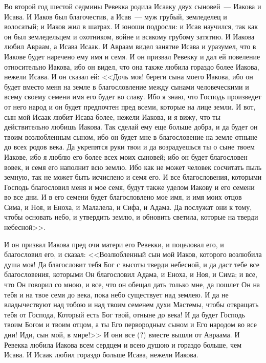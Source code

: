 Во второй год шестой седмины Ревекка родила
Исааку двух сыновей~--- Иакова и Исава. И Иаков был
благочестив, а Исав~--- муж грубый, земледелец и
волосатый; и Иаков жил в шатрах. И юноши подросли:
и Исав научился, так как он был земледельцем и
охотником, войне и всякому грубому затятию. И
Иакова любил Авраам, а Исава Исаак. И Авраам видел
занятие Исава и уразумел, что в Иакове будет
наречено ему имя и семя. И он призвал Ревекку и
дал ей повеление относительно Иакова, ибо он
видел, что она также любила гораздо более Иакова,
нежели Исава. И он сказал ей: <<Дочь моя! береги
сына моего Иакова, ибо он будет вместо меня на
земле в благословление между сынами
человеческими и всему своему семени имя его будет
во славу. Ибо я знаю, что Господь произведет от
него народ и он будет предпочтен пред всеми,
которые на лице земли. И вот, сын мой Исаак любит
Исава более, нежели Иакова, и я вижу, что ты
действительно любишь Иакова. Так сделай ему еще
больше добра, и да будет он твоим возлюбленным сыном,
ибо он будет мне в благословение на земле
отныне до всех родов века. Да укрепятся руки твои
и да возрадуешься ты о сыне твоем Иакове, ибо я
люблю его более всех моих сыновей; ибо он будет
благословен вовек, и семя его наполнит всю землю.
Ибо как не может человек сосчитать пыль земную,
так не может быть исчислено и семя его. И все
благословения, которыми Господь благословил
меня и мое семя, будут также уделом Иакову и его
семени во все дни. И в его семени будет
благословлено мое имя, и имя моих отцов Сима, и
Ноя, и Еноха, и Малалела, и Сифа, и Адама. Да
послужат они к тому, чтобы основать небо, и
утвердить землю, и обновить светила, которые на
тверди небесной>>.

И он призвал Иакова пред очи матери его Ревекки,
и поцеловал его, и благословил его, и сказал:
<<Возлюбленный сын мой Иаков, которого
возлюбила душа моя! Да благословит тебя Бог с
высоты тверди небесной, и да даст тебе все
благословения, которыми Он благословил Адама, и
Еноха, и Ноя, и Сима; и все, что Он говорил со мною,
и все, что он обещал дать только мне, да пошлет Он
на тебя и на твое семя до века, пока небо
существует над землею. И да не владычествуют над
тобою и над твоим семенем духи Мастемы, чтобы
отвращать тебя от Господа, Который есть Бог твой,
отныне до века! И да будет Господь твоим Богом и
твоим отцом, а ты Его первородным сыном и Его
народом во все дни! Иди, сын мой, в мире!>> И они
все (?) вместе вышли от Авраама. И Ревекка любила
Иакова всем сердцем и всею душою и гораздо
больше, чем Исава. И Исаак любил гораздо больше
Исава, нежели Иакова.

